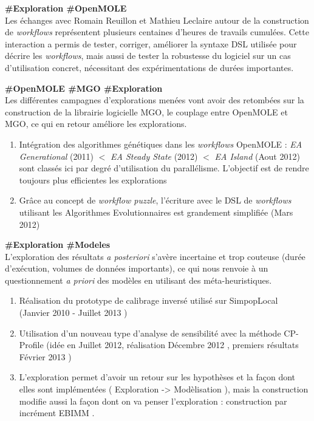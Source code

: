 \begin{myitemize2}

\item [1] \textbf{\#Exploration \#OpenMOLE} \\ Les échanges avec Romain Reuillon et Mathieu Leclaire autour de la construction de \textit{workflows} représentent plusieurs centaines d'heures de travails cumulées. Cette interaction a permis de tester, corriger, améliorer la syntaxe DSL utilisée pour décrire les \textit{workflows}, mais aussi de tester la robustesse du logiciel sur un cas d'utilisation concret, nécessitant des expérimentations de durées importantes.

\item[2] \textbf{\#OpenMOLE \#MGO \#Exploration} \\ Les différentes campagnes d'explorations menées vont avoir des retombées sur la construction de la librairie logicielle MGO, le couplage entre OpenMOLE et MGO, ce qui en retour améliore les explorations.

\begin{enumerate}
\item Intégration des algorithmes génétiques dans les \textit{workflows} OpenMOLE : \textit{EA Generational} (2011) $<$ \textit{EA Steady State} (2012) $<$  \textit{EA Island} (Aout 2012)  sont classés ici par degré d'utilisation du parallélisme. L'objectif est de rendre toujours plus efficientes les explorations
\item Grâce au concept de \textit{workflow puzzle}, l'écriture avec le DSL de \textit{workflows} utilisant les Algorithmes Evolutionnaires est grandement simplifiée (Mars 2012)
\end{enumerate}

\item[3] \textbf{\#Exploration \#Modeles} \\ L'exploration des résultats \textit{a posteriori} s'avère incertaine et trop couteuse (durée d'exécution, volumes de données importants), ce qui nous renvoie à un questionnement \textit{a priori} des modèles en utilisant des méta-heuristiques.
\begin{enumerate}
	\item Réalisation du prototype de calibrage inversé utilisé sur SimpopLocal (Janvier 2010 - Juillet 2013 )
	\item Utilisation d'un nouveau type d'analyse de sensibilité avec la méthode CP-Profile (idée en Juillet 2012, réalisation Décembre 2012 , premiers résultats Février 2013 )
	\item L'exploration permet d'avoir un retour sur les hypothèses et la façon dont elles sont implémentées ( Exploration -> Modèlisation ), mais la construction modifie aussi la façon dont on va penser l'exploration : construction par incrément EBIMM \autocite{Cottineau2015}.
\end{enumerate}


\end{myitemize2}
